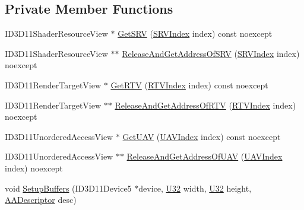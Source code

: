 \subsection*{Private Member Functions}
\begin{DoxyCompactItemize}
\item 
I\+D3\+D11\+Shader\+Resource\+View $\ast$ \hyperlink{classmage_1_1_rendering_output_manager_adbccd7240023dd803ce7764e6d4e3298}{Get\+S\+RV} (\hyperlink{classmage_1_1_rendering_output_manager_a25aa12ba77bb160c5641cf54f7a68a29}{S\+R\+V\+Index} index) const noexcept
\item 
I\+D3\+D11\+Shader\+Resource\+View $\ast$$\ast$ \hyperlink{classmage_1_1_rendering_output_manager_ab6b8045718c2dbfc8b64c23d220a2288}{Release\+And\+Get\+Address\+Of\+S\+RV} (\hyperlink{classmage_1_1_rendering_output_manager_a25aa12ba77bb160c5641cf54f7a68a29}{S\+R\+V\+Index} index) noexcept
\item 
I\+D3\+D11\+Render\+Target\+View $\ast$ \hyperlink{classmage_1_1_rendering_output_manager_a367665fe249f8dd373ae48f4f6c731bd}{Get\+R\+TV} (\hyperlink{classmage_1_1_rendering_output_manager_aebe136819797593f0fcf53b753e9c3ce}{R\+T\+V\+Index} index) const noexcept
\item 
I\+D3\+D11\+Render\+Target\+View $\ast$$\ast$ \hyperlink{classmage_1_1_rendering_output_manager_a1b8102ba96cdab743499da051ca4fa3f}{Release\+And\+Get\+Address\+Of\+R\+TV} (\hyperlink{classmage_1_1_rendering_output_manager_aebe136819797593f0fcf53b753e9c3ce}{R\+T\+V\+Index} index) noexcept
\item 
I\+D3\+D11\+Unordered\+Access\+View $\ast$ \hyperlink{classmage_1_1_rendering_output_manager_a69f782de38807401a5ee6ab4d47a928c}{Get\+U\+AV} (\hyperlink{classmage_1_1_rendering_output_manager_a34cdd58dd0dda9d78878d79aa3393b89}{U\+A\+V\+Index} index) const noexcept
\item 
I\+D3\+D11\+Unordered\+Access\+View $\ast$$\ast$ \hyperlink{classmage_1_1_rendering_output_manager_acd5d6a8feb5a7d9aa41667be0cef617b}{Release\+And\+Get\+Address\+Of\+U\+AV} (\hyperlink{classmage_1_1_rendering_output_manager_a34cdd58dd0dda9d78878d79aa3393b89}{U\+A\+V\+Index} index) noexcept
\item 
void \hyperlink{classmage_1_1_rendering_output_manager_afea7686ac1181f180c23fe65930a9eba}{Setup\+Buffers} (I\+D3\+D11\+Device5 $\ast$device, \hyperlink{namespacemage_a41c104c036fba3756a74e19f793eeaa1}{U32} width, \hyperlink{namespacemage_a41c104c036fba3756a74e19f793eeaa1}{U32} height, \hyperlink{namespacemage_a86cd40b8f2f42ca4d616cc6ec665a7f2}{A\+A\+Descriptor} desc)
$$
\end{DoxyCompactItemize}
